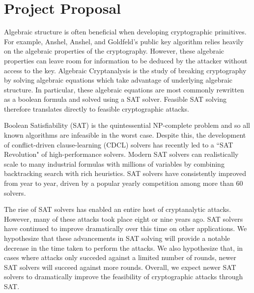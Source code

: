 \section{Project Proposal}

Algebraic structure is often beneficial when developing cryptographic primitives. For example, Anshel, Anshel, and Goldfeld's public key algorithm \cite{AAG99} relies heavily on the algebraic properties of the cryptography. However, these algebraic properties can leave room for information to be deduced by the attacker without access to the key. Algebraic Cryptanalysis \cite{Bard09} is the study of breaking cryptography by solving algebraic equations which take advantage of underlying algebraic structure. In particular, these algebraic equations are most commonly rewritten as a boolean formula and solved using a SAT solver. Feasible SAT solving therefore translates directly to feasible cryptographic attacks.

Boolean Satisfiability (SAT) is the quintessential NP-complete problem and so all known algorithms are infeasible in the worst case. Despite this, the development of conflict-driven clause-learning (CDCL) solvers has recently led to a ``SAT Revolution" of high-performance solvers. \cite{BHMW09} Modern SAT solvers can realistically scale to many industrial formulas with millions of variables by combining backtracking search with rich heuristics. \cite{MZ09} SAT solvers have consistently improved from year to year, driven by a popular yearly competition among more than 60 solvers. \cite{JLRS12}

The rise of SAT solvers has enabled an entire host of cryptanalytic attacks. However, many of these attacks took place  \cite{CB07,CNO08,DKV07,MCP07,MZ06} eight or nine years ago. SAT solvers have continued to improve dramatically over this time on other applications. We hypothesize that these advancements in SAT solving will provide a notable decrease in the time taken to perform the attacks. We also hypothesize that, in cases where attacks only succeded against a limited number of rounds, newer SAT solvers will succeed against more rounds. Overall, we expect newer SAT solvers to dramatically improve the feasibility of cryptographic attacks through SAT.

